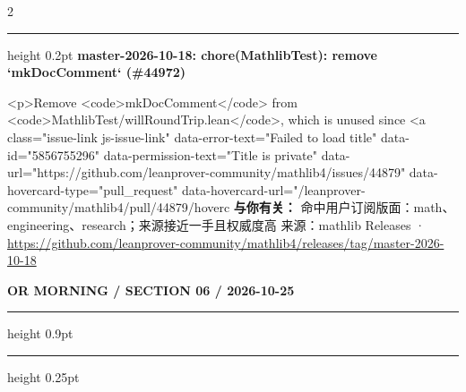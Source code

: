 \documentclass[10.5pt]{ctexart}
\begin{document}
\begin{multicols}{2}
\hrule height 0.2pt
\vspace{2mm}
{\large\bfseries master-2026-10-18: chore(MathlibTest): remove `mkDocComment` (\#44972)}\par
<p>Remove <code>mkDocComment</code> from <code>MathlibTest/willRoundTrip.lean</code>, which is unused since <a class="issue-link js-issue-link" data-error-text="Failed to load title" data-id="5856755296" data-permission-text="Title is private" data-url="https://github.com/leanprover-community/mathlib4/issues/44879" data-hovercard-type="pull\_request" data-hovercard-url="/leanprover-community/mathlib4/pull/44879/hoverc
\textbf{与你有关：} 命中用户订阅版面：math、engineering、research；来源接近一手且权威度高
{\footnotesize\color{ormuted} 来源：mathlib Releases · \url{https://github.com/leanprover-community/mathlib4/releases/tag/master-2026-10-18}}
\end{multicols}
\newpage
{\small\bfseries OR MORNING / SECTION 06 / 2026-10-25}
\vspace{2mm}
\hrule height 0.9pt
\vspace{1.5mm}
\hrule height 0.25pt
\vspace{4mm}
\end{document}

